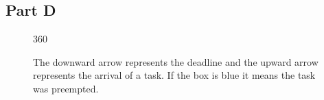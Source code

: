 \documentclass{article}
\begin{document}
	\subsection*{Part D}
	\begin{figure}[H]
		\begin{RTGrid}[width=16cm,height=8cm,nonumbers=1,labelsize=\Large, nosymbols=1]{3}{60}
			
			
			
			
			
			
			
			
			
			
			
			
			
			
			
			
		\end{RTGrid}
		\centering
		\caption{The downward arrow represents the deadline and the upward arrow represents the arrival of a task. If the box is blue it means the task was preempted.}
	\end{figure}
\end{document}
